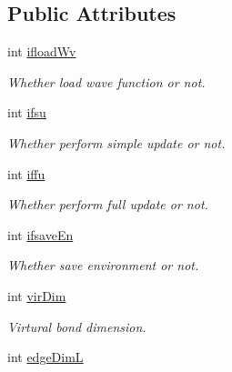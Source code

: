 \subsection*{Public Attributes}
\begin{DoxyCompactItemize}
\item 
int \hyperlink{structparaIpeps_abb58b55025feb471954aaf30dfcff9f3}{ifload\+Wv}\hypertarget{structparaIpeps_abb58b55025feb471954aaf30dfcff9f3}{}\label{structparaIpeps_abb58b55025feb471954aaf30dfcff9f3}

\begin{DoxyCompactList}\small\item\em Whether load wave function or not. \end{DoxyCompactList}\item 
int \hyperlink{structparaIpeps_ae2b8e1e065370bd959f0b556bbea21f1}{ifsu}\hypertarget{structparaIpeps_ae2b8e1e065370bd959f0b556bbea21f1}{}\label{structparaIpeps_ae2b8e1e065370bd959f0b556bbea21f1}

\begin{DoxyCompactList}\small\item\em Whether perform simple update or not. \end{DoxyCompactList}\item 
int \hyperlink{structparaIpeps_a444e3c2547c3a2e219e7a81ebd283cde}{iffu}\hypertarget{structparaIpeps_a444e3c2547c3a2e219e7a81ebd283cde}{}\label{structparaIpeps_a444e3c2547c3a2e219e7a81ebd283cde}

\begin{DoxyCompactList}\small\item\em Whether perform full update or not. \end{DoxyCompactList}\item 
int \hyperlink{structparaIpeps_a569c6ba37bcb16192db7168e4c910882}{ifsave\+En}\hypertarget{structparaIpeps_a569c6ba37bcb16192db7168e4c910882}{}\label{structparaIpeps_a569c6ba37bcb16192db7168e4c910882}

\begin{DoxyCompactList}\small\item\em Whether save environment or not. \end{DoxyCompactList}\item 
int \hyperlink{structparaIpeps_aa26062282b7e9a1b2be29668f05e4719}{vir\+Dim}\hypertarget{structparaIpeps_aa26062282b7e9a1b2be29668f05e4719}{}\label{structparaIpeps_aa26062282b7e9a1b2be29668f05e4719}

\begin{DoxyCompactList}\small\item\em Virtural bond dimension. \end{DoxyCompactList}\item 
int \hyperlink{structparaIpeps_acb9fdda75bd36b5c3dbb10074a4e3437}{edge\+DimL}\hypertarget{structparaIpeps_acb9fdda75bd36b5c3dbb10074a4e3437}{}\label{structparaIpeps_acb9fdda75bd36b5c3dbb10074a4e3437}


\end{DoxyCompactItemize}
